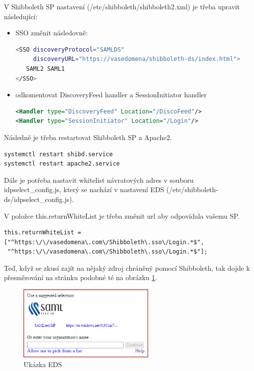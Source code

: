 V Shibboleth SP nastavení (/etc/shibboleth/shibboleth2.xml) je třeba upravit následující:\\
 \begin{itemize}
    \item
SSO změnit následovně:

\begin{lstlisting}[language=Bash]
<SSO discoveryProtocol="SAMLDS" 
     discoveryURL="https://vasedomena/shibboleth-ds/index.html">
   SAML2 SAML1
</SSO>
\end{lstlisting}
\item
odkomentovat DiscoveryFeed handler a SessionInitiator handler

\begin{lstlisting}[language=xml]
<Handler type="DiscoveryFeed" Location="/DiscoFeed"/>
<Handler type="SessionInitiator" Location="/Login"/>
\end{lstlisting}
\end{itemize}
Následně je třeba restartovat Shibboleth SP a Apache2.

\begin{lstlisting}[language=Bash]
systemctl restart shibd.service
systemctl restart apache2.service
\end{lstlisting}

Dále je potřeba nastavit whitelist návratových adres v souboru idpselect\_config.js, který se nachází v nastavení EDS (/etc/shibboleth-ds/idpselect\_config.js).

V položce this.returnWhiteList je třeba změnit url aby odpovídala vašemu SP. 

\begin{lstlisting}[]
this.returnWhiteList = 
["^https:\/\/vasedomena\.com\/Shibboleth\.sso\/Login.*$",
 "^https:\/\/vasedomena\.com\/Shibboleth\.sso\/Login.*$"];
\end{lstlisting}

Teď, když se zkusí zajít na nějaký zdroj chráněný pomocí Shibboleth, tak dojde k přesměrování na stránku podobné té na obrázku \ref{EDS}.

\begin{figure}[bp]
	\centering
    \includegraphics[width=0.6\textwidth]{obrazky-figures/disc.png}
	\caption{Ukázka EDS}
	\label{EDS}
\end{figure}

